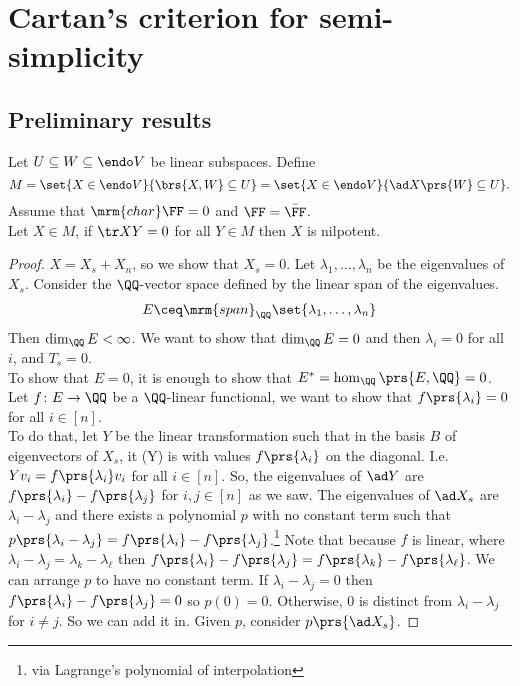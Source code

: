 \documentclass[10pt,a4paper,twoside,openany,hidelinks]{book}
\begin{document}
\chapter{Cartan's criterion for semi-simplicity}
\section{Preliminary results}
\begin{proposition}
Let $U\subseteq W \subseteq \endo V$ be linear subspaces.
Define \[M = \set{X \in \endo V}{\brs{X,W} \subseteq U} = \set{X \in \endo V}{\ad X\prs{W} \subseteq U}\text{.}\]
Assume that $\mrm{char}\FF = 0$ and $\FF = \bar{\FF}$. \\
Let $X \in M$, if $\tr XY = 0$ for all $Y \in M$ then $X$ is nilpotent.
\end{proposition}
\begin{proof}
$X = X_s + X_n$, so we show that $X_s = 0$. Let $\lambda_1, \ldots, \lambda_n$ be the eigenvalues of $X_s$. Consider the $\QQ$-vector space defined by the linear span of the eigenvalues.
\begin{align*}
E \ceq \mrm{span}_{\QQ}\set{\lambda_1, \ldots, \lambda_n}
\end{align*}
Then $\dim_{\QQ}E < \infty$.
We want to show that $\dim_{\QQ}E = 0$ and then $\lambda_i = 0$ for all $i$, and $T_s = 0$.\\
To show that $E=0$, it is enough to show that $E^* = \hom_{\QQ}\prs{E, \QQ} = 0$.
Let $f \colon E \to \QQ$ be a $\QQ$-linear functional, we want to show that $f\prs{\lambda_i} = 0$ for all $i \in [n]$.\\
To do that, let $Y$ be the linear transformation such that in the basis $B$ of eigenvectors of $X_s$, it (Y) is with values $f\prs{\lambda_i}$ on the diagonal. I.e. $Yv_i = f\prs{\lambda_i}v_i$ for all $i\in[n]$.
So, the eigenvalues of $\ad Y$ are $f\prs{\lambda_i} - f\prs{\lambda_j}$ for $i,j \in [n]$ as we saw.
The eigenvalues of $\ad X_s$ are $\lambda_i - \lambda_j$ and there exists a polynomial $p$ with no constant term such that $p\prs{\lambda_i - \lambda_j} = f\prs{\lambda_i} - f\prs{\lambda_j}$.\footnote{via Lagrange's polynomial of interpolation}
Note that because $f$ is linear, where $\lambda_i - \lambda_j = \lambda_k - \lambda_{\ell}$ then $f\prs{\lambda_i} - f\prs{\lambda_j} = f\prs{\lambda_k} - f\prs{\lambda_{\ell}}$.
We can arrange $p$ to have no constant term. If $\lambda_i - \lambda_j=0$ then $f\prs{\lambda_i} - f\prs{\lambda_j} = 0$ so $p(0) = 0$. Otherwise, $0$ is distinct from $\lambda_i - \lambda_j$ for $i\neq j$. So we can add it in. Given $p$, consider $p\prs{\ad X_s}$.

\end{proof}
\end{document}
